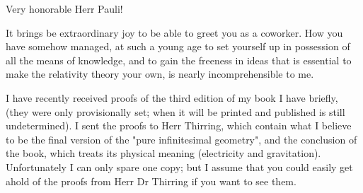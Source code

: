 \begin{letter}{1}

\begin{header}
\date{1919/05/10}

\makeheader

\end{header}

Very honorable Herr Pauli!

It brings be extraordinary joy to be able to greet you as a coworker. How you have somehow managed, at such a young age to set yourself up in possession of all the means of knowledge, and to gain the freeness in ideas that is essential to make the relativity theory your own, is nearly incomprehensible to me.

I have recently received proofs of the third edition of my book I have briefly,  (they were only provisionally set; when it will be printed and published is still undetermined). I sent the proofs to Herr Thirring, which contain what I believe to be the final version of the "pure infinitesimal geometry", and the conclusion of the book, which treats its physical meaning (electricity and gravitation). Unfortunately I can only spare one copy; but I assume that you could easily get ahold of the proofs from Herr Dr Thirring if you want to see them.


\end{letter}
